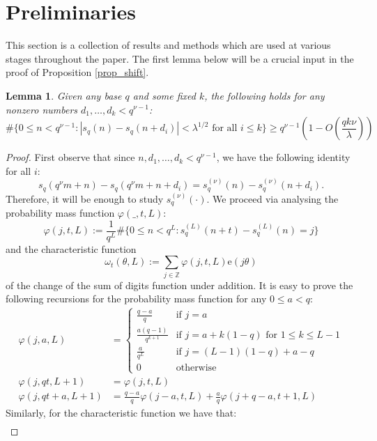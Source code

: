 \documentclass[12pt]{amsart}
\renewcommand{\leq}{\leqslant}
\renewcommand{\geq}{\geqslant}
\newtheorem{lemma}[theorem]{Lemma}
\theoremstyle{definition}
\numberwithin{equation}{section}
\newcommand\e{\mathrm{e}}
\numberwithin{equation}{section}
\begin{document}
\section{Preliminaries} \label{sec_Prelim}
This section is a collection of results and methods which are used at various stages throughout the paper. The first lemma below will be a crucial input in the proof of Proposition \ref{prop_shift}. 
\begin{lemma}\label{Addition}
	Given any base $q$ and some fixed $k$, the following holds for any nonzero numbers $d_1, \dots, d_k<q^{\nu-1}$:
	\[
	\#\{0\leq n < q^{\nu-1}: |s_q(n)-s_q(n+d_i)|<\lambda^{1/2} \text{ for all } i\leq k\}\geq q^{\nu-1}\left(1-O\left(\frac{qk\nu}{\lambda}\right)\right)
	\]
\end{lemma}
\begin{proof}
	First observe that since $n,d_1, \dots, d_k<q^{\nu-1}$, we have the following identity  for all $i$:
	\[
	s_q(q^{\nu}m+n)-s_q(q^{\nu}m+n+d_i)=s_q^{(\nu)}(n)-s_q^{(\nu)}(n+d_i).
	\]
	Therefore, it will be enough to study $s_q^{(\nu)}(\cdot)$. We proceed via analysing the probability mass function $\varphi(\_,t,L)$:
	\begin{equation}
		\varphi(j,t,L):=\frac{1}{q^{L}}\#\{0\leq n < q^{L}:s_{q}^{(L)}(n+t)-s_{q}^{(L)}(n)=j\}
	\end{equation}
	and the characteristic function
	\begin{equation*}
		\omega_t(\theta, L):=\sum_{j\in\mathbb{Z}}\varphi(j,t,L)\e(j\theta)
	\end{equation*}
	of the change of the sum of digits function under addition.
	It is easy to prove the following recursions for the probability mass function for any $0\leq a<q$:
	\begin{align}
		\varphi(j,a,L)&=\begin{cases}
			\frac{q-a}{q} & \text{if } j=a\\
			\frac{a(q-1)}{q^{k+1}}	& \text{if } j=a+k(1-q) \text{ for } 1\leq k \leq L-1\\
			\frac{a}{q^L}	& \text{if } j= (L-1)(1-q)+a-q\\
			0 & \text{otherwise }
		\end{cases}\\
		\varphi(j,qt,L+1)&=\varphi(j,t,L)\\
		\varphi(j,qt+a,L+1)&=\frac{q-a}{q}\varphi(j-a,t,L)+\frac{a}{q}\varphi(j+q-a,t+1,L)
	\end{align}
    Similarly, for the characteristic function we have that:
	\begin{align}

\end{align}
\end{proof}
\end{document}
